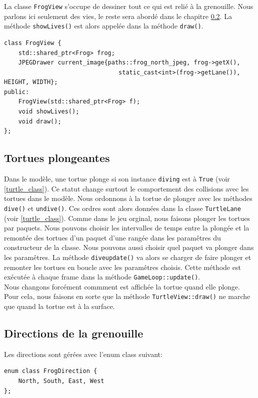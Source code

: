 \documentclass[a4paper, 12pt]{article}
\begin{document}
La classe \texttt{FrogView} s'occupe de dessiner tout ce qui est relié à la grenouille. Nous parlons ici seulement des vies, le reste sera abordé dans le chapitre \ref{frogview}. La méthode \texttt{showLives()} est alors appelée dans la méthode \texttt{draw()}. \\

\begin{lstlisting}
class FrogView {    
    std::shared_ptr<Frog> frog;
    JPEGDrawer current_image{paths::frog_north_jpeg, frog->getX(),
                                static_cast<int>(frog->getLane()), HEIGHT, WIDTH};
public:
    FrogView(std::shared_ptr<Frog> f);
    void showLives();
    void draw();
};
\end{lstlisting}

\subsection{Tortues plongeantes} \label{diving_turtles}

Dans le modèle, une tortue plonge si son instance \texttt{diving} est à \texttt{True} (voir \ref{turtle_class}). Ce statut change surtout le comportement des collisions avec les tortues dans le modèle. Nous ordonnons à la tortue de plonger avec les méthodes \texttt{dive()} et \texttt{undive()}. Ces ordres sont alors données dans la classe \texttt{TurtleLane} (voir \ref{turtle_class}). Comme dans le jeu orginal, nous faisons plonger les tortues par paquets. Nous pouvons choisir les intervalles de temps entre la plongée et la remontée des tortues d'un paquet d'une rangée dans les paramêtres du constructeur de la classe. Nous pouvons aussi choisir quel paquet va plonger dans les paramêtres. La méthode \texttt{dive\textunderscore update()} va alors se charger de faire plonger et remonter les tortues en boucle avec les paramêtres choisis. Cette méthode est exécutée à chaque frame dans la méthode \texttt{GameLoop::update()}. \\

Nous changons forcément commment est affichée la tortue quand elle plonge. Pour cela, nous faisons en sorte que la méthode \texttt{TurtleView::draw()} ne marche que quand la tortue est à la surface.

\subsection{Directions de la grenouille} \label{frogview}
Les directions sont gérées avec l'enum class suivant:
\begin{lstlisting}
enum class FrogDirection {
    North, South, East, West
};
\end{lstlisting}
\end{document}
